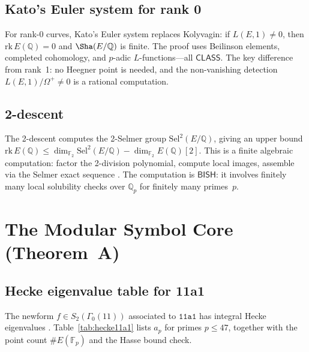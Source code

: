 \documentclass[11pt]{article}
\theoremstyle{plain}
\theoremstyle{definition}
\theoremstyle{remark}
\newcommand{\Q}{\mathbb{Q}}
\newcommand{\F}{\mathbb{F}}
\newcommand{\Sel}{\mathrm{Sel}}
\newcommand{\rk}{\mathrm{rk}}
\newcommand{\BISH}{\ensuremath{\mathsf{BISH}}}
\newcommand{\CLASS}{\ensuremath{\mathsf{CLASS}}}
\begin{document}
\subsection{Kato's Euler system for rank 0}

For rank-0 curves, Kato's Euler system \cite{kato} replaces Kolyvagin: if $L(E,1) \neq 0$, then $\rk\, E(\Q) = 0$ and $\Sha(E/\Q)$ is finite. The proof uses Beilinson elements, completed cohomology, and $p$-adic $L$-functions---all $\CLASS$. The key difference from rank~1: no Heegner point is needed, and the non-vanishing detection $L(E,1)/\Omega^+ \neq 0$ is a rational computation.

\subsection{2-descent}

The 2-descent computes the 2-Selmer group $\Sel^2(E/\Q)$, giving an upper bound $\rk\, E(\Q) \leq \dim_{\F_2} \Sel^2(E/\Q) - \dim_{\F_2} E(\Q)[2]$. This is a finite algebraic computation: factor the 2-division polynomial, compute local images, assemble via the Selmer exact sequence \cite{silverman-aec,cassels-descent}. The computation is $\BISH$: it involves finitely many local solubility checks over $\Q_p$ for finitely many primes~$p$.


\section{The Modular Symbol Core (Theorem~A)}
\label{sec:hecke}

\subsection{Hecke eigenvalue table for 11a1}

The newform $f \in S_2(\Gamma_0(11))$ associated to $\texttt{11a1}$ has integral Hecke eigenvalues \cite{cremona}. Table~\ref{tab:hecke11a1} lists $a_p$ for primes $p \leq 47$, together with the point count $\#E(\F_p)$ and the Hasse bound check.
\end{document}
